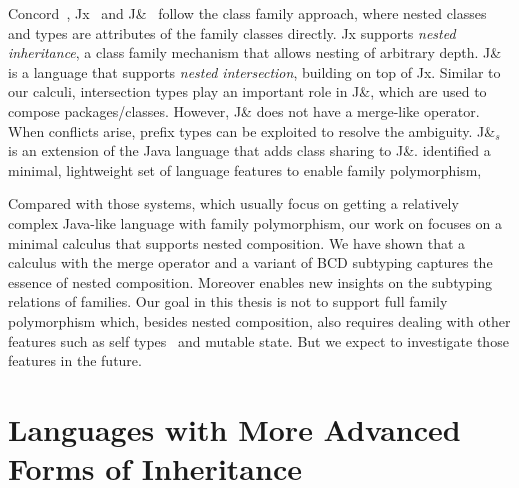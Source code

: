 Concord~\citep{jolly2004simple}, Jx~\citep{Nystrom_2004} and
J\&~\citep{Nystrom:2006} follow the class family approach, where nested classes
and types are attributes of the family classes directly.
Jx supports \emph{nested inheritance}, a class family mechanism that allows
nesting of arbitrary depth. J\& is a language that supports \emph{nested
  intersection}, building on top of Jx. Similar to our calculi, intersection
types play an important role in J\&, which are used to compose packages/classes.
However, J\& does not have a merge-like operator. When conflicts arise, prefix
types can be exploited to resolve the ambiguity. J\&$_s$~\citep{Qi:2009} is an
extension of the Java language that adds class sharing to J\&.
\citet{SAITO_2007} identified a minimal, lightweight set of language features to
enable family polymorphism,

Compared with those systems, which usually focus on getting a relatively complex
Java-like language with family polymorphism, our work on \namee focuses on a
minimal calculus that supports nested composition. We have shown that a calculus
with the merge operator and a variant of BCD subtyping captures the essence of nested
composition. Moreover \namee enables new insights on the subtyping relations of
families. Our goal in this thesis is not to support full family polymorphism
which, besides nested composition, also requires dealing with other features
such as self types~\citep{bruce95thistype,saito09matching} and mutable state.
But we expect to investigate those features in the future.




\section{Languages with More Advanced Forms of Inheritance}

